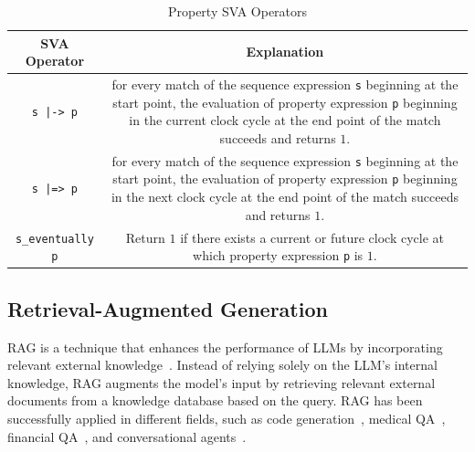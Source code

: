 \begin{table}[t]
\centering
\caption{Property SVA Operators}
\label{tab:property_sva_operators}
\begin{tabular}{|c|c|}
\hline
\textbf{SVA Operator} & \textbf{Explanation} \\
\hline
\texttt{s |-> p} & \tabincell{l}{for every match of the sequence expression \texttt{s} \\beginning at the start point, the evaluation of\\ property expression \texttt{p} beginning in the current\\ clock cycle at the end point of the match \\succeeds and returns $1$.} \\ \hline
\texttt{s |=> p} & \tabincell{l}{for every match of the sequence expression \texttt{s} \\beginning at the start point, the evaluation of\\ property expression \texttt{p} beginning in the next\\ clock cycle at the end point of the match \\succeeds and returns $1$.} \\ \hline
\texttt{s\_eventually p} & \tabincell{l}{Return $1$ if there exists a current or future clock \\cycle at which property expression \texttt{p} is $1$.} \\ \hline
\end{tabular}
\end{table}

\subsection{Retrieval-Augmented Generation}
\label{subsec:RAG}
RAG is a technique that enhances the performance of LLMs by incorporating relevant external knowledge~\cite{Lewis20}.
Instead of relying solely on the LLM's internal knowledge, RAG augments the model’s input by retrieving relevant external documents from a knowledge database based on the query.
RAG has been successfully applied in different fields, such as code generation~\cite{Koziolek24}, medical QA~\cite{xiong2024}, financial QA~\cite{Setty24}, and conversational agents~\cite{alonso2024}.


